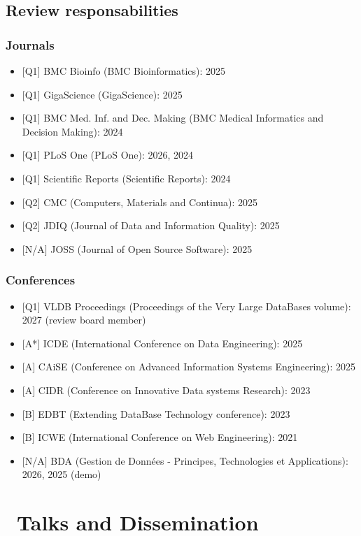 \documentclass{article}
\begin{document}
\subsection*{Review responsabilities}
\subsubsection*{Journals}
\begin{itemize}
\item $[$Q1$]$ BMC Bioinfo (BMC Bioinformatics): 2025
\item $[$Q1$]$ GigaScience (GigaScience): 2025
\item $[$Q1$]$ BMC Med. Inf. and Dec. Making (BMC Medical Informatics and Decision Making): 2024
\item $[$Q1$]$ PLoS One (PLoS One): 2026, 2024
\item $[$Q1$]$ Scientific Reports (Scientific Reports): 2024
\item $[$Q2$]$ CMC (Computers, Materials and Continua): 2025
\item $[$Q2$]$ JDIQ (Journal of Data and Information Quality): 2025
\item $[$N/A$]$ JOSS (Journal of Open Source Software): 2025
\end{itemize}
\subsubsection*{Conferences}
\begin{itemize}
\item $[$Q1$]$ VLDB Proceedings (Proceedings of the Very Large DataBases volume): 2027 (review board member)
\item $[$A*$]$ ICDE (International Conference on Data Engineering): 2025
\item $[$A$]$ CAiSE (Conference on Advanced Information Systems Engineering): 2025
\item $[$A$]$ CIDR (Conference on Innovative Data systems Research): 2023
\item $[$B$]$ EDBT (Extending DataBase Technology conference): 2023
\item $[$B$]$ ICWE (International Conference on Web Engineering): 2021
\item $[$N/A$]$ BDA (Gestion de Données - Principes, Technologies et Applications): 2026, 2025 (demo)
\end{itemize}
\section*{\faMicrophone\ Talks and Dissemination}
\end{document}
